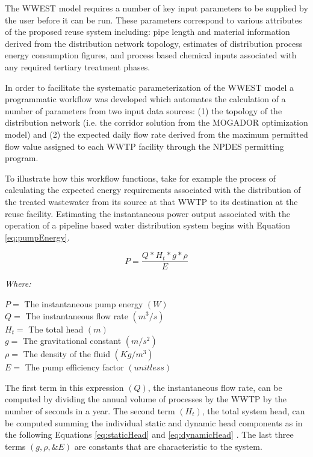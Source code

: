 The WWEST model requires a number of key input parameters to be supplied by the user before it can be run. These parameters correspond to various attributes of the proposed reuse system including: pipe length and material information derived from the distribution network topology, estimates of distribution process energy consumption figures, and process based chemical inputs associated with any required tertiary treatment phases.

In order to facilitate the systematic parameterization of the WWEST model a programmatic workflow was developed which automates the calculation of a number of parameters from two input data sources: (1) the topology of the distribution network (i.e. the corridor solution from the MOGADOR optimization model) and (2) the expected daily flow rate derived from the maximum permitted flow value assigned to each WWTP facility through the NPDES permitting program. 

To illustrate how this workflow functions, take for example the process of calculating the expected energy requirements associated with the distribution of the treated wastewater from its source at that WWTP to its destination at the reuse facility. Estimating the instantaneous power output associated with the operation of a pipeline based water distribution system begins with Equation \ref{eq:pumpEnergy}\cite{Liu2003}.

      \begin{equation}
          P = \frac{Q * H_t * g * \rho}{E}
          \label{eq:pumpEnergy}
      \end{equation}
      
       \noindent \textit{Where:} \hfill

       \begin{center}
           $P = $ The instantaneous pump energy $(W)$ \\
           $Q = $ The instantaneous flow rate $(m^{3}/s)$\\
           $H_{t} = $ The total head $(m)$ \\
           $g = $ The gravitational constant $(m/s^{2})$ \\
           $\rho = $ The density of the fluid $(Kg/m^3)$ \\
           $E = $ The pump efficiency factor $(unitless)$ \\
       \end{center}

The first term in this expression $(Q)$, the instantaneous flow rate, can be computed by dividing the annual volume of processes by the WWTP by the number of seconds in a year. The second term $(H_t)$, the total system head, can be computed summing the individual static and dynamic head components as in the following Equations \ref{eq:staticHead} and \ref{eq:dynamicHead} \cite{Liu2003}. The last three terms $(g,\rho, \& E)$ are constants that are characteristic to the system.

